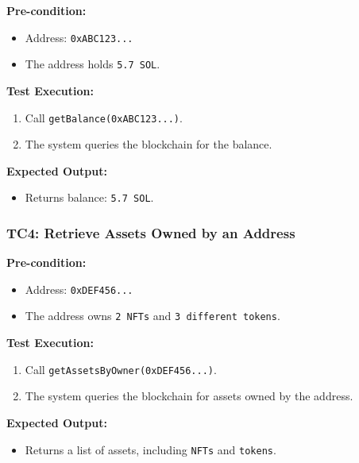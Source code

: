 \documentclass[
]{article}
\providecommand{\tightlist}{%
  \setlength{\itemsep}{0pt}\setlength{\parskip}{0pt}}
\begin{document}
\textbf{Pre-condition:}

\begin{itemize}
\tightlist
\item
  Address: \texttt{0xABC123...}
\item
  The address holds \texttt{5.7\ SOL}.
\end{itemize}

\textbf{Test Execution:}

\begin{enumerate}
\def\labelenumi{\arabic{enumi}.}
\tightlist
\item
  Call \texttt{getBalance(0xABC123...)}.
\item
  The system queries the blockchain for the balance.
\end{enumerate}

\textbf{Expected Output:}

\begin{itemize}
\tightlist
\item
  Returns balance: \texttt{5.7\ SOL}.
\end{itemize}

\hypertarget{tc4-retrieve-assets-owned-by-an-address}{%
\subsubsection{\texorpdfstring{\textbf{TC4: Retrieve Assets Owned by an
Address}}{TC4: Retrieve Assets Owned by an Address}}\label{tc4-retrieve-assets-owned-by-an-address}}

\textbf{Pre-condition:}

\begin{itemize}
\tightlist
\item
  Address: \texttt{0xDEF456...}
\item
  The address owns \texttt{2\ NFTs} and \texttt{3\ different\ tokens}.
\end{itemize}

\textbf{Test Execution:}

\begin{enumerate}
\def\labelenumi{\arabic{enumi}.}
\tightlist
\item
  Call \texttt{getAssetsByOwner(0xDEF456...)}.
\item
  The system queries the blockchain for assets owned by the address.
\end{enumerate}

\textbf{Expected Output:}

\begin{itemize}
\tightlist
\item
  Returns a list of assets, including \texttt{NFTs} and \texttt{tokens}.
\end{itemize}
\end{document}
